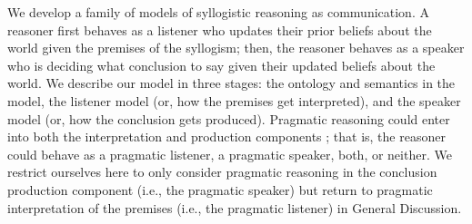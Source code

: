 \documentclass[floatsintext, doc]{apa6}
\begin{document}
We develop a family of models of syllogistic reasoning as communication. 
A reasoner first behaves as a listener who updates their prior beliefs about the world given the premises of the syllogism; then, the reasoner behaves as a speaker who is deciding what conclusion to say given their updated beliefs about the world. 
We describe our model in three stages: the ontology and semantics in the model, the listener model (or, how the premises get interpreted), and the speaker model (or, how the conclusion gets produced). 
Pragmatic reasoning could enter into both the interpretation and production components \cite{Roberts2001}; that is, the reasoner could behave as a pragmatic listener, a pragmatic speaker, both, or neither. 
We restrict ourselves here to only consider pragmatic reasoning in the conclusion production component (i.e., the pragmatic speaker) but return to pragmatic interpretation of the premises (i.e., the pragmatic listener) in General Discussion.





\end{document}
